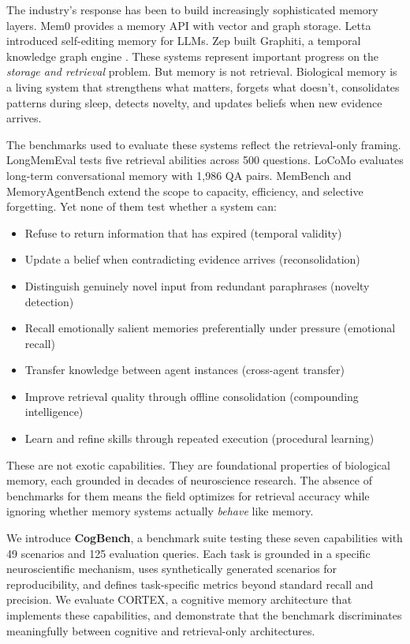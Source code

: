 \documentclass{article}
\begin{document}
The industry's response has been to build increasingly sophisticated memory layers. Mem0 \citep{mem0} provides a memory API with vector and graph storage. Letta \citep{packer2023memgpt} introduced self-editing memory for LLMs. Zep built Graphiti, a temporal knowledge graph engine \citep{zep2025}. These systems represent important progress on the \emph{storage and retrieval} problem. But memory is not retrieval. Biological memory is a living system that strengthens what matters, forgets what doesn't, consolidates patterns during sleep, detects novelty, and updates beliefs when new evidence arrives.

The benchmarks used to evaluate these systems reflect the retrieval-only framing. LongMemEval \citep{wu2024longmemeval} tests five retrieval abilities across 500 questions. LoCoMo \citep{maharana2024locomo} evaluates long-term conversational memory with 1,986 QA pairs. MemBench \citep{tan2025membench} and MemoryAgentBench \citep{zhang2026memoryagentbench} extend the scope to capacity, efficiency, and selective forgetting. Yet none of them test whether a system can:

\begin{itemize}[nosep]
  \item Refuse to return information that has expired (temporal validity)
  \item Update a belief when contradicting evidence arrives (reconsolidation)
  \item Distinguish genuinely novel input from redundant paraphrases (novelty detection)
  \item Recall emotionally salient memories preferentially under pressure (emotional recall)
  \item Transfer knowledge between agent instances (cross-agent transfer)
  \item Improve retrieval quality through offline consolidation (compounding intelligence)
  \item Learn and refine skills through repeated execution (procedural learning)
\end{itemize}

These are not exotic capabilities. They are foundational properties of biological memory, each grounded in decades of neuroscience research. The absence of benchmarks for them means the field optimizes for retrieval accuracy while ignoring whether memory systems actually \emph{behave} like memory.

We introduce \textbf{CogBench}, a benchmark suite testing these seven capabilities with 49 scenarios and 125 evaluation queries. Each task is grounded in a specific neuroscientific mechanism, uses synthetically generated scenarios for reproducibility, and defines task-specific metrics beyond standard recall and precision. We evaluate CORTEX, a cognitive memory architecture that implements these capabilities, and demonstrate that the benchmark discriminates meaningfully between cognitive and retrieval-only architectures.
\end{document}
